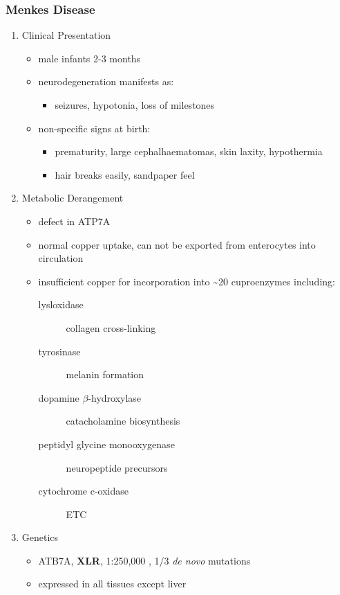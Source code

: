\documentclass{scrartcl}
\begin{document}
\subsubsection{Menkes Disease}
\label{sec:org85c4966}
\begin{enumerate}
\item Clinical Presentation
\label{sec:org588a52c}
\begin{itemize}
\item male infants 2-3 months
\item neurodegeneration manifests as:
\begin{itemize}
\item seizures, hypotonia, loss of milestones
\end{itemize}
\item non-specific signs at birth:
\begin{itemize}
\item prematurity, large cephalhaematomas, skin laxity, hypothermia
\item hair breaks easily, sandpaper feel
\end{itemize}
\end{itemize}

\item Metabolic Derangement
\label{sec:org3efcc4f}
\begin{itemize}
\item defect in ATP7A
\item normal copper uptake, can not be exported from enterocytes into circulation
\item insufficient copper for incorporation into \textasciitilde{}20 cuproenzymes including:
\begin{description}
\item[{lysloxidase}] collagen cross-linking
\item[{tyrosinase}] melanin formation
\item[{dopamine \(\beta\)-hydroxylase}] catacholamine biosynthesis
\item[{peptidyl glycine monooxygenase}] neuropeptide precursors
\item[{cytochrome c-oxidase}] ETC
\end{description}
\end{itemize}

\item Genetics
\label{sec:org4828e09}
\begin{itemize}
\item ATB7A, \textbf{XLR}, 1:250,000 , 1/3 \emph{de novo} mutations
\item expressed in all tissues except liver
\end{itemize}


\end{enumerate}
\end{document}
